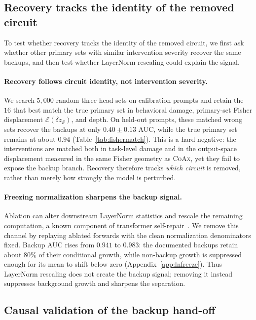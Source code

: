 \documentclass{article} %
\theoremstyle{plain}
\theoremstyle{definition}
\newcommand{\coax}{\textsc{CoAx}\xspace}
\newcommand{\energy}{\mathcal{E}}
\newcommand{\dz}{\delta z}
\newcommand{\Sset}{\mathcal{S}}
\begin{document}
\subsection{Recovery tracks the identity of the removed circuit}
\label{sec:specificity}

To test whether recovery tracks the identity of the removed circuit, we first ask whether other primary sets with similar intervention severity recover the same backups, and then test whether LayerNorm rescaling could explain the signal.

\paragraph{Recovery follows circuit identity, not intervention severity.}
We search $5{,}000$ random three-head sets on calibration prompts and retain the $16$ that best match the true primary set in behavioral damage, primary-set Fisher displacement $\energy(\dz_\Sset)$, and depth.
On held-out prompts, these matched wrong sets recover the backups at only $0.40{\pm}0.13$ AUC, while the true primary set remains at about $0.94$ (Table~\ref{tab:fishermatch}).
This is a hard negative: the interventions are matched both in task-level damage and in the output-space displacement measured in the same Fisher geometry as \coax, yet they fail to expose the backup branch.
Recovery therefore tracks \emph{which circuit} is removed, rather than merely how strongly the model is perturbed.

\paragraph{Freezing normalization sharpens the backup signal.}
Ablation can alter downstream LayerNorm statistics and rescale the remaining computation, a known component of transformer self-repair~\citep{rushing2024selfrepair}.
We remove this channel by replaying ablated forwards with the clean normalization denominators fixed.
Backup AUC rises from $0.941$ to $0.983$: the documented backups retain about $80\%$ of their conditional growth, while non-backup growth is suppressed enough for its mean to shift below zero (Appendix~\ref{app:lnfreeze}).
Thus LayerNorm rescaling does not create the backup signal; removing it instead suppresses background growth and sharpens the separation.

\subsection{Causal validation of the backup hand-off}
\label{sec:realbackups}
\end{document}
